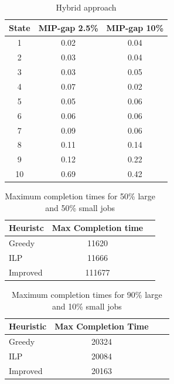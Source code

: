 \documentclass{article}
\begin{document}
\begin{appendices}
\begin{table}[ht]
\centering
\caption{Hybrid approach}
\label{tab: Hybrid Q-table}
\begin{tabular}{|c|c|c|}
\hline
State & MIP-gap 2.5\% & MIP-gap 10\% \\
\hline
1 & 0.02 & 0.04 \\
2 & 0.03 & 0.04 \\
3 & 0.03 & 0.05 \\
4 & 0.07 & 0.02 \\
5 & 0.05 & 0.06 \\
6 & 0.06 & 0.06 \\
7 & 0.09 & 0.06 \\
8 & 0.11 & 0.14 \\
9 & 0.12 & 0.22 \\
10 & 0.69 & 0.42 \\
\hline
\end{tabular}
\end{table}

\begin{table}[ht]
\centering
\begin{tabular}{lcc}
\toprule
Heuristc & Max Completion time  \\ 
\midrule
Greedy             & 11620     \\     
ILP           & 11666         \\ 
Improved       & 111677        \\ 
\bottomrule
\end{tabular}
\caption{Maximum completion times for 50\% large and 50\% small jobs}
\label{tab:completion_times}
\end{table}

\begin{table}[ht]
\centering
\begin{tabular}{lccc}
\toprule
Heuristic & Max Completion Time \\
\midrule
Greedy & 20324 \\
ILP & 20084 \\
Improved & 20163\\
\bottomrule
\end{tabular}
\caption{Maximum completion times for 90\% large and 10\% small jobs}
\label{tab:completion_times_large}
\end{table}
\newpage

\end{appendices}
\end{document}
